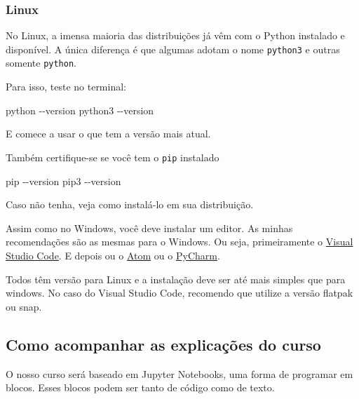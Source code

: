 \documentclass[a4paper, 11pt, brazilian]{article}
\newenvironment{Shaded}{}{}
\newcommand{\ExtensionTok}[1]{{#1}}
\newcommand{\AttributeTok}[1]{\textcolor[rgb]{0.49,0.56,0.16}{{#1}}}
\begin{document}
\hypertarget{linux-1}{%
\subsubsection{Linux}\label{linux-1}}

No Linux, a imensa maioria das distribuições já vêm com o Python
instalado e disponível. A única diferença é que algumas adotam o nome
\texttt{python3} e outras somente \texttt{python}.

Para isso, teste no terminal:

\begin{Shaded}
\begin{Highlighting}[]
\ExtensionTok{python} \AttributeTok{{-}{-}version}
\ExtensionTok{python3} \AttributeTok{{-}{-}version}
\end{Highlighting}
\end{Shaded}

E comece a usar o que tem a versão mais atual.

Também certifique-se se você tem o \texttt{pip} instalado

\begin{Shaded}
\begin{Highlighting}[]
\ExtensionTok{pip} \AttributeTok{{-}{-}version}
\ExtensionTok{pip3} \AttributeTok{{-}{-}version}
\end{Highlighting}
\end{Shaded}

Caso não tenha, veja como instalá-lo em sua distribuição.

Assim como no Windows, você deve instalar um editor. As minhas
recomendações são as mesmas para o Windows. Ou seja, primeiramente o
\href{https://code.visualstudio.com/}{Visual Studio Code}. E depois ou o
\href{https://atom.io/}{Atom} ou o
\href{https://www.jetbrains.com/pt-br/pycharm/download/}{PyCharm}.

Todos têm versão para Linux e a instalação deve ser até mais simples que
para windows. No caso do Visual Studio Code, recomendo que utilize a
versão flatpak ou snap.

\hypertarget{como-acompanhar-as-explicauxe7uxf5es-do-curso}{%
\subsection{Como acompanhar as explicações do
curso}\label{como-acompanhar-as-explicauxe7uxf5es-do-curso}}

O nosso curso será baseado em Jupyter Notebooks, uma forma de programar
em blocos. Esses blocos podem ser tanto de código como de texto.
\end{document}
